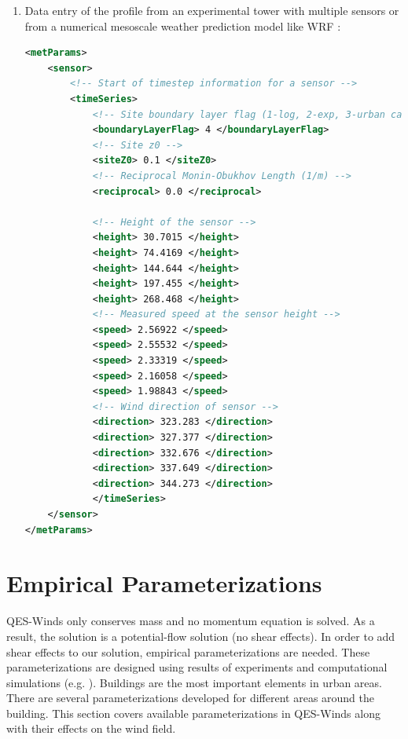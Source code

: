 \begin{enumerate}
\item Data entry of the profile from an experimental tower with multiple sensors or from a numerical mesoscale weather prediction model like WRF \cite{powers2017weather}:

\begin{lstlisting}[language=XML]
<metParams>
	<sensor>
		<!-- Start of timestep information for a sensor -->
	    <timeSeries>						
			<!-- Site boundary layer flag (1-log, 2-exp, 3-urban canopy, 4-data entry) -->       
       		<boundaryLayerFlag> 4 </boundaryLayerFlag> 			
			<!-- Site z0 -->          	
          	<siteZ0> 0.1 </siteZ0>
          	<!-- Reciprocal Monin-Obukhov Length (1/m) --> 									
          	<reciprocal> 0.0 </reciprocal>
          
         	<!-- Height of the sensor -->
          	<height> 30.7015 </height> 							
          	<height> 74.4169 </height>
          	<height> 144.644 </height>
          	<height> 197.455 </height>
          	<height> 268.468 </height>
          	<!-- Measured speed at the sensor height -->
          	<speed> 2.56922 </speed> 							
          	<speed> 2.55532 </speed>
          	<speed> 2.33319 </speed>
          	<speed> 2.16058 </speed>
          	<speed> 1.98843 </speed>
          	<!-- Wind direction of sensor -->
          	<direction> 323.283 </direction> 					
          	<direction> 327.377 </direction>
          	<direction> 332.676 </direction>
          	<direction> 337.649 </direction>
          	<direction> 344.273 </direction>
    		</timeSeries>
	</sensor>
</metParams>
\end{lstlisting}

\end{enumerate}

\section{Empirical Parameterizations}

QES-Winds only conserves mass and no momentum equation is solved. As a result, the solution is a potential-flow solution (no shear effects). In order to add shear effects to our solution, empirical parameterizations are needed. These parameterizations are designed using results of experiments and computational simulations (e.g. \cite{singh2008evaluation,brown2013quic}). Buildings are the most important elements in urban areas. There are several parameterizations developed for different areas around the building. This section covers available parameterizations in QES-Winds along with their effects on the wind field.

